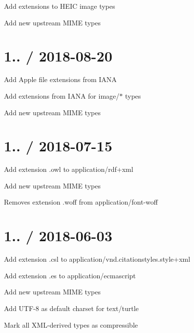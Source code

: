 
\begin{DoxyItemize}
\item Add extensions to H\+E\+IC image types
\item Add new upstream M\+I\+ME types
\end{DoxyItemize}

\section*{1.. / 2018-\/08-\/20 }


\begin{DoxyItemize}
\item Add Apple file extensions from I\+A\+NA
\item Add extensions from I\+A\+NA for {\ttfamily image/$\ast$} types
\item Add new upstream M\+I\+ME types
\end{DoxyItemize}

\section*{1.. / 2018-\/07-\/15 }


\begin{DoxyItemize}
\item Add extension {\ttfamily .owl} to {\ttfamily application/rdf+xml}
\item Add new upstream M\+I\+ME types
\begin{DoxyItemize}
\item Removes extension {\ttfamily .woff} from {\ttfamily application/font-\/woff}
\end{DoxyItemize}
\end{DoxyItemize}

\section*{1.. / 2018-\/06-\/03 }


\begin{DoxyItemize}
\item Add extension {\ttfamily .csl} to {\ttfamily application/vnd.\+citationstyles.\+style+xml}
\item Add extension {\ttfamily .es} to {\ttfamily application/ecmascript}
\item Add new upstream M\+I\+ME types
\item Add {\ttfamily U\+T\+F-\/8} as default charset for {\ttfamily text/turtle}
\item Mark all X\+M\+L-\/derived types as compressible
\end{DoxyItemize}

